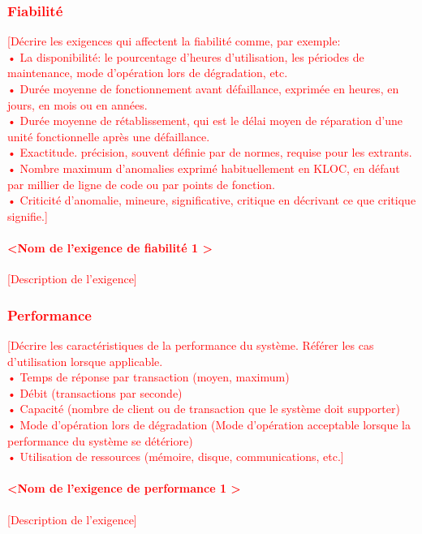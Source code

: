 \documentclass[10pt,a4paper]{report}
\begin{document}
\textcolor{red}{\subsubsection{Fiabilité}
[Décrire les exigences qui affectent la fiabilité comme, par exemple:\\
•	La disponibilité: le pourcentage d’heures d’utilisation, les périodes de maintenance, mode d’opération lors de dégradation, etc.\\
•	Durée moyenne de fonctionnement avant défaillance, exprimée en heures, en jours, en mois ou en années.\\
•	Durée moyenne de rétablissement, qui est le délai moyen de réparation d'une unité fonctionnelle après une défaillance.\\
•	Exactitude. précision, souvent définie par de normes, requise pour les extrants.\\
•	Nombre maximum d’anomalies exprimé habituellement en KLOC, en défaut par millier de ligne de code ou par points de fonction.\\
•	Criticité d’anomalie, mineure, significative, critique en décrivant ce que critique signifie.]
\paragraph{\textless Nom de l’exigence de fiabilité 1 \textgreater}
[Description de l’exigence]}

\textcolor{red}{\subsubsection{Performance}
[Décrire les caractéristiques de la performance du système. Référer les cas d’utilisation lorsque applicable.\\
•	Temps de réponse par transaction (moyen, maximum)\\
•	Débit (transactions par seconde)\\
•	Capacité (nombre de client ou de transaction que le système doit supporter)\\
•	Mode d’opération lors de dégradation (Mode d’opération acceptable lorsque la performance du système se détériore)\\
•	Utilisation de ressources (mémoire, disque, communications, etc.]
\paragraph{\textless Nom de l’exigence de performance 1 \textgreater}
[Description de l’exigence]}
\end{document}
